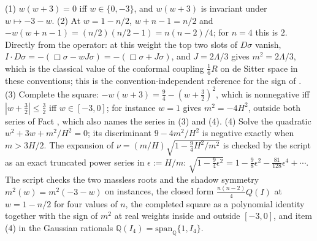 (1) $w(w+3) = 0$ iff $w \in \{0,-3\}$, and $w(w+3)$ is invariant under $w \mapsto -3-w$. (2) At $w = 1 - n/2$, $w + n - 1 = n/2$ and $-w(w+n-1) = (n/2)(n/2 - 1) = n(n-2)/4$; for $n = 4$ this is $2$. Directly from the operator: at this weight the top two slots of $D\sigma$ vanish, $I \cdot D\sigma = -(\Box\sigma - wJ\sigma) = -(\Box\sigma + J\sigma)$, and $J = 2\Lambda/3$ gives $m^{2} = 2\Lambda/3$, which is the classical value of the conformal coupling $\tfrac16 R$ on de Sitter space in these conventions; this is the convention-independent reference for the sign of . (3) Complete the square: $-w(w+3) = \tfrac94 - (w+\tfrac32)^{2}$, which is nonnegative iff $|w + \tfrac32| \le \tfrac32$ iff $w \in [-3,0]$; for instance $w = 1$ gives $m^{2} = -4H^{2}$, outside both series of Fact , which also names the series in (3) and (4). (4) Solve the quadratic $w^{2} + 3w + m^{2}/H^{2} = 0$; its discriminant $9 - 4m^{2}/H^{2}$ is negative exactly when $m > 3H/2$. The expansion of $\nu = (m/H)\sqrt{1 - \tfrac94 H^{2}/m^{2}}$ is checked by the script as an exact truncated power series in $\epsilon := H/m$: $\sqrt{1 - \tfrac94\epsilon^{2}} = 1 - \tfrac98\epsilon^{2} - \tfrac{81}{128}\epsilon^{4} + \cdots$. The script checks the two massless roots and the shadow symmetry $m^{2}(w) = m^{2}(-3-w)$ on instances, the closed form $\tfrac{n(n-2)}{4}Q(I)$ at $w = 1 - n/2$ for four values of $n$, the completed square as a polynomial identity together with the sign of $m^{2}$ at real weights inside and outside $[-3,0]$, and item (4) in the Gaussian rationals $\mathbb{Q}(I_4) = \mathrm{span}_{\mathbb{Q}}\{1, I_4\}$.

